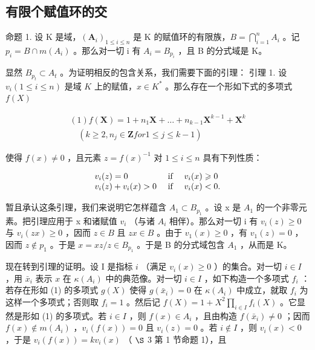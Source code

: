 \subsection{有限个赋值环的交}

命题 1. 设 K 是域，\((\mathbf{A}_{i})_{1 \leqslant i \leqslant n}\) 是 K 的赋值环的有限族，\(B = \bigcap_{i=1}^{n} A_{i}\) 。记 \(p_{i} = B \cap m(A_{i})\) 。那么对一切 i 有 \(A_{i} = B_{p_{i}}\) ，且 B 的分式域是 K。

显然 \(B_{p_t} \subset A_t\) 。为证明相反的包含关系，我们需要下面的引理： 引理 1. 设 \(v_i (1 \leqslant i \leqslant n)\) 是域 \(K\) 上的赋值，\(x \in K^*\) 。那么存在一个形如下式的多项式 \(f(X)\)

\[
\begin{array}{l} (1) f (\mathbf {X}) = 1 + n _ {1} \mathbf {X} + \dots + n _ {k - 1} \mathbf {X} ^ {k - 1} + \mathbf {X} ^ {k} \\ \quad (k \geqslant 2, n _ {j} \in \mathbf {Z} for 1 \leqslant j \leqslant k - 1) \end{array}
\]

使得 \(f(x) \neq 0\) ，且元素 \(z = f(x)^{-1}\) 对 \(1 \leqslant i \leqslant n\) 具有下列性质：

\[
\begin{array}{l l} v _ {i} (z) = 0 & \text { if } \quad v _ {i} (x) \geqslant 0 \\ v _ {i} (z) + v _ {i} (x) > 0 & \text { if } \quad v _ {i} (x) <   0. \end{array}
\]

暂且承认这条引理，我们来说明它怎样蕴含 \(A_{1} \subset B_{p_{1}}\) 。设 x 是 \(A_{1}\) 的一个非零元素。把引理应用于 x 和诸赋值 \(v_{i}\) （与诸 \(A_{i}\) 相伴）。那么对一切 i 有 \(v_{i}(z) \geqslant 0\) 与 \(v_{i}(zx) \geqslant 0\) ，因而 \(z \in B\) 且 \(zx \in B\) 。由于 \(v_{1}(x) \geqslant 0\) ，有 \(v_{1}(z) = 0\) ，因而 \(z \notin p_{1}\) 。于是 \(x = xz/z \in B_{p_{1}}\) 。于是 B 的分式域包含 \(A_{1}\) ，从而是 K。

现在转到引理的证明。设 I 是指标 \(i\) （满足 \(v_{i}(x) \geqslant 0\) ）的集合。对一切 \(i \in I\) ，用 \(\bar{x}_{i}\) 表示 \(x\) 在 \(\kappa(A_{i})\) 中的典范像。对一切 \(i \in I\) ，如下构造一个多项式 \(f_{i}\) ：若存在形如 (1) 的多项式 \(g(X)\) 使得 \(g(\bar{x}_{i}) = 0\) 在 \(\kappa(A_{i})\) 中成立，就取 \(f_{i}\) 为这样一个多项式；否则取 \(f_{i} = 1\) 。然后记 \(f(X) = 1 + X^{2} \prod_{i \in I} f_{i}(X)\) 。它显然是形如 (1) 的多项式。若 \(i \in I\) ，则 \(f(x) \in A_{i}\) ，且由构造 \(f(\bar{x}_{i}) \neq 0\) ；因而 \(f(x) \notin m(A_{i})\) ，\(v_{i}(f(x)) = 0\) 且 \(v_{i}(z) = 0\) 。若 \(i \notin I\) ，则 \(v_{i}(x) < 0\) ，于是 \(v_{i}(f(x)) = kv_{i}(x)\) （ \(\S\) 3 第 1 节命题 1），且


